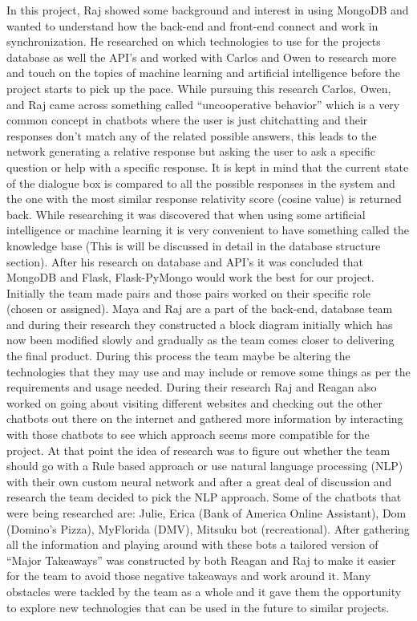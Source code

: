\documentclass[titlepage, 12pt]{article}
\begin{document}
In this project, Raj showed some background and interest in using MongoDB and wanted to understand how the back-end and front-end connect and work in synchronization. He researched on which technologies to use for the projects database as well the API’s and worked with Carlos and Owen to research more and touch on the topics of machine learning and artificial intelligence before the project starts to pick up the pace. While pursuing this research Carlos, Owen, and Raj came across something called “uncooperative behavior” which is a very common concept in chatbots where the user is just chitchatting and their responses don’t match any of the related possible answers, this leads to the network generating a relative response but asking the user to ask a specific question or help with a specific response. It is kept in mind that the current state of the dialogue box is compared to all the possible responses in the system and the one with the most similar response relativity score (cosine value) is returned back. While researching it was discovered that when using some artificial intelligence or machine learning it is very convenient to have something called the knowledge base (This is will be discussed in detail in the database structure section). After his research on database and API’s it was concluded that MongoDB and Flask, Flask-PyMongo would work the best for our project. Initially the team made pairs and those pairs worked on their specific role (chosen or assigned). Maya and Raj are a part of the back-end, database team and during their research they constructed a block diagram initially which has now been modified slowly and gradually as the team comes closer to delivering the final product. During this process the team maybe be altering the technologies that they may use and may include or remove some things as per the requirements and usage needed. During their research Raj and Reagan also worked on going about visiting different websites and checking out the other chatbots out there on the internet and gathered more information by interacting with those chatbots to see which approach seems more compatible for the project. At that point the idea of research was to figure out whether the team should go with a Rule based approach or use natural language processing (NLP) with their own custom neural network and after a great deal of discussion and research the team decided to pick the NLP approach. Some of the chatbots that were being researched are: Julie, Erica (Bank of America Online Assistant), Dom (Domino’s Pizza), MyFlorida (DMV), Mitsuku bot (recreational). After gathering all the information and playing around with these bots a tailored version of “Major Takeaways” was constructed by both Reagan and Raj to make it easier for the team to avoid those negative takeaways and work around it.  Many obstacles were tackled by the team as a whole and it gave them the opportunity to explore new technologies that can be used in the future to similar projects.
\end{document}
